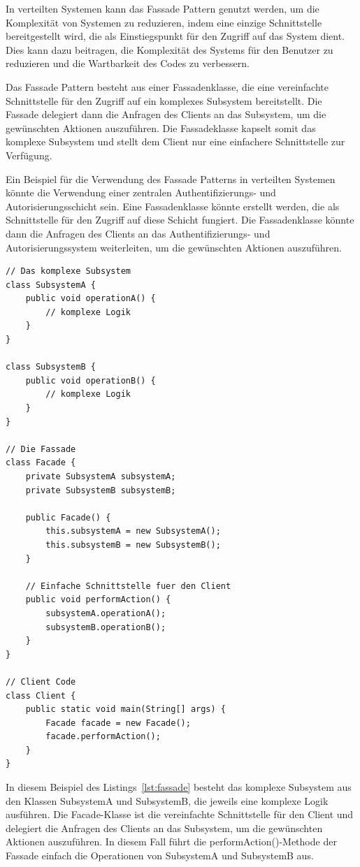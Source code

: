 \documentclass[../vs-script-first-v01.tex]{subfiles}
\begin{document}
In verteilten Systemen kann das Fassade Pattern genutzt werden, um die Komplexität von Systemen zu reduzieren, indem eine einzige Schnittstelle bereitgestellt wird, die als Einstiegspunkt für den Zugriff auf das System dient. Dies kann dazu beitragen, die Komplexität des Systems für den Benutzer zu reduzieren und die Wartbarkeit des Codes zu verbessern.

Das Fassade Pattern besteht aus einer Fassadenklasse, die eine vereinfachte Schnittstelle für den Zugriff auf ein komplexes Subsystem bereitstellt. Die Fassade delegiert dann die Anfragen des Clients an das Subsystem, um die gewünschten Aktionen auszuführen. Die Fassadeklasse kapselt somit das komplexe Subsystem und stellt dem Client nur eine einfachere Schnittstelle zur Verfügung.

Ein Beispiel für die Verwendung des Fassade Patterns in verteilten Systemen könnte die Verwendung einer zentralen Authentifizierungs- und Autorisierungsschicht sein. Eine Fassadenklasse könnte erstellt werden, die als Schnittstelle für den Zugriff auf diese Schicht fungiert. Die Fassadenklasse könnte dann die Anfragen des Clients an das Authentifizierungs- und Autorisierungssystem weiterleiten, um die gewünschten Aktionen auszuführen.

\noindent\begin{minipage}{\textwidth}
\begin{lstlisting}[caption={Fassade Pattern},captionpos=b,label={lst:fassade}]
// Das komplexe Subsystem
class SubsystemA {
    public void operationA() {
        // komplexe Logik
    }
}

class SubsystemB {
    public void operationB() {
        // komplexe Logik
    }
}

// Die Fassade
class Facade {
    private SubsystemA subsystemA;
    private SubsystemB subsystemB;
    
    public Facade() {
        this.subsystemA = new SubsystemA();
        this.subsystemB = new SubsystemB();
    }
    
    // Einfache Schnittstelle fuer den Client
    public void performAction() {
        subsystemA.operationA();
        subsystemB.operationB();
    }
}

// Client Code
class Client {
    public static void main(String[] args) {
        Facade facade = new Facade();
        facade.performAction();
    }
}
\end{lstlisting}
\end{minipage}

In diesem Beispiel des Listings~\ref{lst:fassade} besteht das komplexe Subsystem aus den Klassen SubsystemA und SubsystemB, die jeweils eine komplexe Logik ausführen. Die Facade-Klasse ist die vereinfachte Schnittstelle für den Client und delegiert die Anfragen des Clients an das Subsystem, um die gewünschten Aktionen auszuführen. In diesem Fall führt die performAction()-Methode der Fassade einfach die Operationen von SubsystemA und SubsystemB aus.
\end{document}
